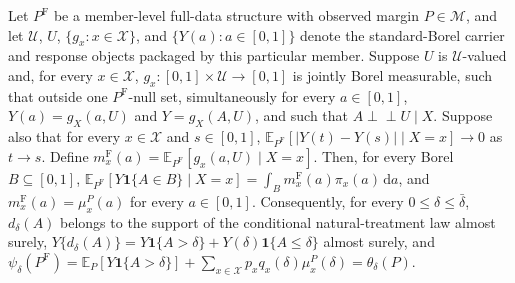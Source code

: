 Let \(P^{\mathrm F}\) be a member-level full-data structure with observed margin \(P\in\mathcal M\), and let \(\mathcal U\), \(U\), \(\{g_x:x\in\mathcal X\}\), and \(\{Y(a):a\in[0,1]\}\) denote the standard-Borel carrier and response objects packaged by this particular member. Suppose \(U\) is \(\mathcal U\)-valued and, for every \(x\in\mathcal X\), \(g_x:[0,1]\times\mathcal U\to[0,1]\) is jointly Borel measurable, such that outside one \(P^{\mathrm F}\)-null set, simultaneously for every \(a\in[0,1]\), \(Y(a)=g_X(a,U)\) and \(Y=g_X(A,U)\), and such that \(A\perp\!\!\!\perp U\mid X\). Suppose also that for every \(x\in\mathcal X\) and \(s\in[0,1]\), \(\mathbb E_{P^{\mathrm F}}[|Y(t)-Y(s)|\mid X=x]\to0\) as \(t\to s\). Define \(m_x^{\mathrm F}(a)=\mathbb E_{P^{\mathrm F}}[g_x(a,U)\mid X=x]\). Then, for every Borel \(B\subseteq[0,1]\), \(\mathbb E_{P^{\mathrm F}}[Y\mathbf 1\{A\in B\}\mid X=x]=\int_Bm_x^{\mathrm F}(a)\pi_x(a)\,\mathrm da\), and \(m_x^{\mathrm F}(a)=\mu_x^P(a)\) for every \(a\in[0,1]\). Consequently, for every \(0\leq\delta\leq\bar\delta\), \(d_\delta(A)\) belongs to the support of the conditional natural-treatment law almost surely, \(Y\{d_\delta(A)\}=Y\mathbf 1\{A>\delta\}+Y(\delta)\mathbf 1\{A\leq\delta\}\) almost surely, and \(\psi_\delta(P^{\mathrm F})=\mathbb E_P[Y\mathbf 1\{A>\delta\}]+\sum_{x\in\mathcal X}p_xq_x(\delta)\mu_x^P(\delta)=\theta_\delta(P)\).